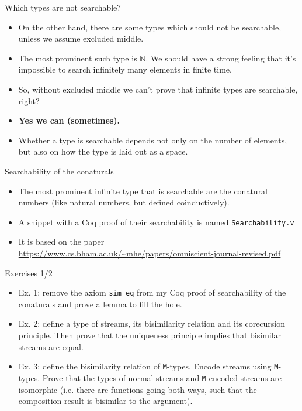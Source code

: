 \documentclass{beamer}
\begin{document}
\begin{frame}{Which types are not searchable?}
\begin{itemize}
	\item On the other hand, there are some types which should not be searchable, unless we assume excluded middle.
	\item The most prominent such type is $\mathbb{N}$. We should have a strong feeling that it's impossible to search infinitely many elements in finite time.
	\item So, without excluded middle we can't prove that infinite types are searchable, right?
	\item \textbf{Yes we can (sometimes).}
	\item Whether a type is searchable depends not only on the number of elements, but also on how the type is laid out as a space.
\end{itemize}
\end{frame}

\begin{frame}{Searchability of the conaturals}
\begin{itemize}
	\item The most prominent infinite type that is searchable are the conatural numbers (like natural numbers, but defined coinductively).
	\item A snippet with a Coq proof of their searchability is named \texttt{Searchability.v}
	\item It is based on the paper \url{https://www.cs.bham.ac.uk/~mhe/papers/omniscient-journal-revised.pdf}
\end{itemize}
\end{frame}

\begin{frame}{Exercises 1/2}
\begin{itemize}
	\item Ex. 1: remove the axiom \texttt{sim\_eq} from my Coq proof of searchability of the conaturals and prove a lemma to fill the hole.
	\item Ex. 2: define a type of streams, its bisimilarity relation and its corecursion principle. Then prove that the uniqueness principle implies that bisimilar streams are equal.
	\item Ex. 3: define the bisimilarity relation of \texttt{M}-types. Encode streams using \texttt{M}-types. Prove that the types of normal streams and \texttt{M}-encoded streams are isomorphic (i.e. there are functions going both ways, such that the composition result is bisimilar to the argument).
\end{itemize}
\end{frame}
\end{document}
